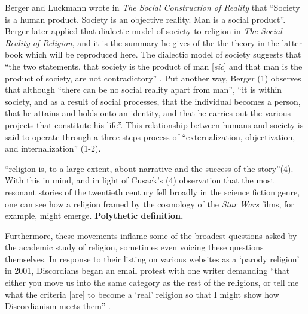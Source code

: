 \documentclass[Draft.tex]{subfiles}
\begin{document}
Berger and Luckmann \parencite*[79]{Berger67} wrote in
\textit{The Social Construction of Reality} that
``Society is a human product. Society is an objective reality.
Man is a social product''.
Berger later applied that dialectic model of society to religion
in \textit{The Social Reality of Religion},
and it is the summary he gives of the the theory
in the latter book which will be reproduced here.
The dialectic model of society suggests that
``the two statements, that society is the product of man
[\textit{sic}] and that
man is the product of society, are not contradictory''
\parencite[1]{Berger69}.
Put another way, Berger (1) observes that although
``there can be no social reality apart from man'',
``it is within society, and as a result of social processes,
that the individual becomes a person,
that he attains and holds onto an identity,
and that he carries out the various projects that constitute his life''.
This relationship between humans and society is said to operate
through a three steps process of
``externalization, objectivation, and internalization'' (1-2).

``religion is, to a large extent, about narrative
and the success of the story''(4).
With this in mind, and in light of Cusack's (4) observation
that the most resonant stories of the twentieth century
fell broadly in the science fiction genre,
one can see how a religion framed by the cosmology of
the \textit{Star Wars} films, for example, might emerge.
\textbf{Polythetic definition.}



Furthermore, these movements inflame some of
the broadest questions asked by the academic study of religion,
sometimes even voicing these questions themselves.
In response to their listing on various websites as a `parody religion'
in 2001, Discordians began an email protest with one writer demanding
``that either you move us into the same category
as the rest of the religions, or tell me what the criteria [are]
to become a `real' religion so that I might show
how Discordianism meets them'' \parencite[209]{Chidester05}.
\end{document}
